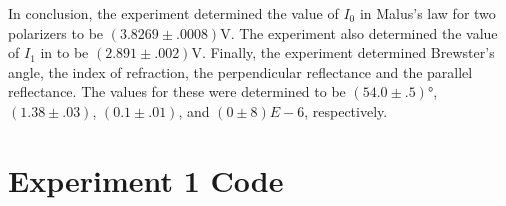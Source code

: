 \begin{paper}
	In conclusion, the experiment determined the value of $I_0$ in Malus's law for two polarizers to be $(3.8269 \pm .0008)\si{\volt}$. The experiment also determined the value of $I_1$ in \eqThreePolarizers to be $(2.891 \pm .002) \si{\volt}$. Finally, the experiment determined Brewster's angle, the index of refraction, the perpendicular reflectance and the parallel reflectance. The values for these were determined to be $(54.0\pm.5)\si{\degree}$, $(1.38\pm.03)$, $(0.1\pm.01)$, and $(0\pm8)\si{E-6}$, respectively.
	


\end{paper}
\section*{Experiment 1 Code}
